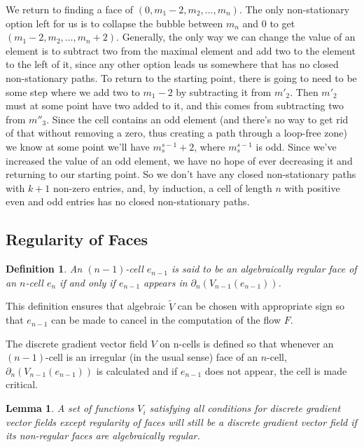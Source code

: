 \documentclass{amsart}
\newtheorem{Definition}[theorem]{Definition}
\newtheorem{lemma}[theorem]{Lemma}
\begin{document}
We return to finding a face of $(0,m_1-2,m_2,\ldots,m_n)$. The only non-stationary option left for us is to collapse the bubble between $m_n$ and $0$ to get $(m_1-2,m_2,\ldots,m_n+2)$. Generally, the only way we can change the value of an element is to subtract two from the maximal element and add two to the element to the left of it, since any other option leads us somewhere that has no closed non-stationary paths. To return to the starting point, there is going to need to be some step where we add two to $m_1-2$ by subtracting it from $m'_2$. Then $m'_2$ must at some point have two added to it, and this comes from subtracting two from $m''_3$. Since the cell contains an odd element (and there's no way to get rid of that without removing a zero, thus creating a path through a loop-free zone) we know at some point we'll have $m^{s-1}_s+2$, where $m^{s-1}_s$ is odd. Since we've increased the value of an odd element, we have no hope of ever decreasing it and returning to our starting point. So we don't have any closed non-stationary paths with $k+1$ non-zero entries, and, by induction, a cell of length $n$ with positive even and odd entries has no closed non-stationary paths.

\subsection{Regularity of Faces}
\begin{Definition}
	An $(n-1)$-cell $e_{n-1}$ is said to be an algebraically regular face of an $n$-cell $e_{n}$ if and only if $e_{n-1}$ appears in $\partial_{n}(V_{n-1}(e_{n-1}))$.
\end{Definition}

This definition ensures that algebraic $\widetilde{V}$ can be chosen with appropriate sign so that $e_{n-1}$ can be made to cancel in the computation of the flow $F$.

The discrete gradient vector field $V$ on n-cells is defined so that whenever an $(n-1)$-cell is an irregular (in the usual sense) face of an $n$-cell, $\partial_{n}(V_{n-1}(e_{n-1}))$ is calculated and if $e_{n-1}$ does not appear, the cell is made critical.

\begin{lemma}
	A set of functions $V_{i}$ satisfying all conditions for discrete gradient vector fields except regularity of faces will still be a discrete gradient vector field if its non-regular faces are algebraically regular.
\end{lemma}
\end{document}

